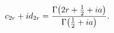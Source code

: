 \[c_{2r}+id_{2r}=\frac{\mathop{\Gamma\/}\nolimits\!\left(2r+\tfrac{1}{2}+ia%
\right)}{\mathop{\Gamma\/}\nolimits\!\left(\tfrac{1}{2}+ia\right)}.\]